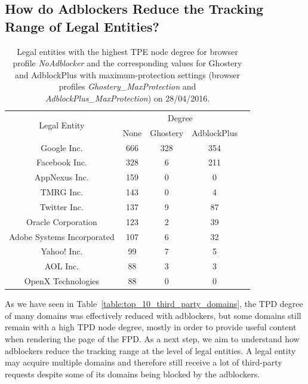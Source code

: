 \documentclass[compsoc, conference, letterpaper, 10pt, times]{IEEEtran}
\begin{document}


\subsection{How do Adblockers Reduce the Tracking Range of Legal Entities?}


\begin{table}
  \centering
  \begin{tabular}{|c|c|c|c|c|}
  \hline
  \multirow{2}{*}{Legal Entity} & \multicolumn{3}{|c|}{Degree} \\
  \cline{2-4}
    & \scriptsize{None} & \scriptsize{Ghostery} & \scriptsize{AdblockPlus} \\
  \hline
  Google Inc. & 666 & 328 & 354 \\
  Facebook Inc. & 328 & 6 & 211 \\
  AppNexus Inc. & 159 & 0 & 0 \\
  TMRG Inc. & 143 & 0 & 4 \\
  Twitter Inc. & 137 & 9 & 87 \\
  Oracle Corporation & 123 & 2 & 39 \\
  Adobe Systems Incorporated & 107 & 6 & 32 \\
  Yahoo! Inc. & 99 & 7 & 5 \\
  AOL Inc. & 88 & 3 & 3 \\
  OpenX Technologies & 88 & 0 & 0 \\
  \hline
  \end{tabular}
  \caption{Legal entities with the highest TPE node degree for browser profile \textit{NoAdblocker} and the corresponding values for Ghostery and AdblockPlus with maximum-protection settings (browser profiles \textit{Ghostery\_MaxProtection} and \textit{AdblockPlus\_MaxProtection}) on 28/04/2016.}
  \label{table:top_10_tpd_entities}
  \end{table}


As we have seen in Table~\ref{table:top_10_third_party_domains}, the TPD degree of many domains was effectively reduced with adblockers, but some domains still remain with a high TPD node degree, mostly in order to provide useful content when rendering the page of the FPD. As a next step, we aim to understand how adblockers reduce the tracking range at the level of legal entities. A legal entity may acquire multiple domains and therefore still receive a lot of third-party requests despite some of its domains being blocked by the adblockers.
\end{document}
